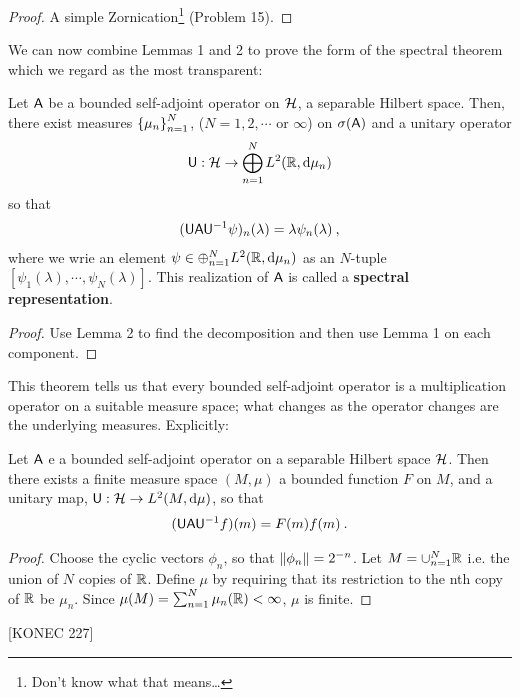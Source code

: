 \begin{proof}
    A simple Zornication\footnote{Don't know what that means\dots} (Problem 15).
\end{proof}

We can now combine Lemmas 1 and 2 to prove the form of the spectral theorem which we regard as the most transparent:

\begin{theorem}
    Let $\mathsf{A}$ be a bounded self-adjoint operator on $\mathcal{H}$, a separable Hilbert space. Then, there exist measures $\left \lbrace \mu_n \right \rbrace_{n=1}^N$, ($N = 1,2,\cdots$ or $\infty$) on $\sigma(\mathsf{A})$ and a unitary operator
    \begin{align}
        \mathsf{U} : \mathcal{H} \to \bigoplus_{n=1}^N L^{2}(\mathbb{R}, \mathrm{d} \mu_n)
    \end{align}
    so that \begin{align}
        (\mathsf{U} \mathsf{A} \mathsf{U}^{-1} \psi)_n (\lambda) = \lambda \psi_n(\lambda) \:,
    \end{align}
    where we wrie an element $\psi \in \oplus_{n=1}^N L^{2}(\mathbb{R}, \mathrm{d} \mu_n)$ as an $N$-tuple $[\psi_1(\lambda), \cdots, \psi_N(\lambda)]$. This realization of $\mathsf{A}$ is called a \textbf{spectral representation}.
\end{theorem}

\begin{proof}
    Use Lemma 2 to find the decomposition and then use Lemma 1 on each component.
\end{proof}

This theorem tells us that every bounded self-adjoint operator is a multiplication operator on a suitable measure space; what changes as the operator changes are the underlying measures. Explicitly:

\begin{corollary}
    Let $\mathsf{A}$ e a bounded self-adjoint operator on a separable Hilbert space $\mathcal{H}$. Then there exists a finite measure space $(M, \mu)$ a bounded function $F$ on $M$, and a unitary map, $ \mathsf{U}: \mathcal{H} \to L^{2}(M, \mathrm{d} \mu)$, so that
    \begin{align}
        (\mathsf{U} \mathsf{A} \mathsf{U}^{-1} f) (m) = F(m) f(m) \:.
    \end{align}
\end{corollary}

\begin{proof}
    Choose the cyclic vectors $\phi_n$, so that $\left \Vert \phi_n \right \Vert = 2^{-n}$. Let $M = \cup_{n=1}^N \mathbb{R}$ i.e. the union of $N$ copies of $\mathbb{R}$. Define $\mu$ by requiring that its restriction to the nth copy of $\mathbb{R}$ be $\mu_n$. Since $\mu(M) = \sum_{n=1}^N \mu_n(\mathbb{R}) < \infty$, $\mu$ is finite.
\end{proof}

[KONEC 227]